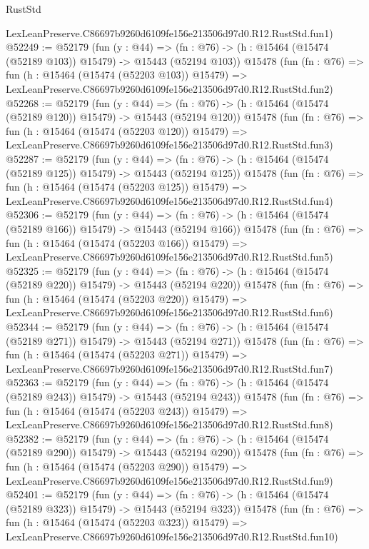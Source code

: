 \begin{lexlean}{RustStd}
\begin{coremodule}
    LexLeanPreserve.C86697b9260d6109fe156e213506d97d0.R12.RustStd.fun1)
@52249 := @52179
    (fun (y : @44) =>
    (fn : @76) -> (h : @15464 (@15474 (@52189 @103)) @15479) -> @15443 (@52194 @103))
    @15478
    (fun (fn : @76) =>
    fun (h : @15464 (@15474 (@52203 @103)) @15479) =>
    LexLeanPreserve.C86697b9260d6109fe156e213506d97d0.R12.RustStd.fun2)
@52268 := @52179
    (fun (y : @44) =>
    (fn : @76) -> (h : @15464 (@15474 (@52189 @120)) @15479) -> @15443 (@52194 @120))
    @15478
    (fun (fn : @76) =>
    fun (h : @15464 (@15474 (@52203 @120)) @15479) =>
    LexLeanPreserve.C86697b9260d6109fe156e213506d97d0.R12.RustStd.fun3)
@52287 := @52179
    (fun (y : @44) =>
    (fn : @76) -> (h : @15464 (@15474 (@52189 @125)) @15479) -> @15443 (@52194 @125))
    @15478
    (fun (fn : @76) =>
    fun (h : @15464 (@15474 (@52203 @125)) @15479) =>
    LexLeanPreserve.C86697b9260d6109fe156e213506d97d0.R12.RustStd.fun4)
@52306 := @52179
    (fun (y : @44) =>
    (fn : @76) -> (h : @15464 (@15474 (@52189 @166)) @15479) -> @15443 (@52194 @166))
    @15478
    (fun (fn : @76) =>
    fun (h : @15464 (@15474 (@52203 @166)) @15479) =>
    LexLeanPreserve.C86697b9260d6109fe156e213506d97d0.R12.RustStd.fun5)
@52325 := @52179
    (fun (y : @44) =>
    (fn : @76) -> (h : @15464 (@15474 (@52189 @220)) @15479) -> @15443 (@52194 @220))
    @15478
    (fun (fn : @76) =>
    fun (h : @15464 (@15474 (@52203 @220)) @15479) =>
    LexLeanPreserve.C86697b9260d6109fe156e213506d97d0.R12.RustStd.fun6)
@52344 := @52179
    (fun (y : @44) =>
    (fn : @76) -> (h : @15464 (@15474 (@52189 @271)) @15479) -> @15443 (@52194 @271))
    @15478
    (fun (fn : @76) =>
    fun (h : @15464 (@15474 (@52203 @271)) @15479) =>
    LexLeanPreserve.C86697b9260d6109fe156e213506d97d0.R12.RustStd.fun7)
@52363 := @52179
    (fun (y : @44) =>
    (fn : @76) -> (h : @15464 (@15474 (@52189 @243)) @15479) -> @15443 (@52194 @243))
    @15478
    (fun (fn : @76) =>
    fun (h : @15464 (@15474 (@52203 @243)) @15479) =>
    LexLeanPreserve.C86697b9260d6109fe156e213506d97d0.R12.RustStd.fun8)
@52382 := @52179
    (fun (y : @44) =>
    (fn : @76) -> (h : @15464 (@15474 (@52189 @290)) @15479) -> @15443 (@52194 @290))
    @15478
    (fun (fn : @76) =>
    fun (h : @15464 (@15474 (@52203 @290)) @15479) =>
    LexLeanPreserve.C86697b9260d6109fe156e213506d97d0.R12.RustStd.fun9)
@52401 := @52179
    (fun (y : @44) =>
    (fn : @76) -> (h : @15464 (@15474 (@52189 @323)) @15479) -> @15443 (@52194 @323))
    @15478
    (fun (fn : @76) =>
    fun (h : @15464 (@15474 (@52203 @323)) @15479) =>
    LexLeanPreserve.C86697b9260d6109fe156e213506d97d0.R12.RustStd.fun10)

\end{coremodule}
\end{lexlean}
